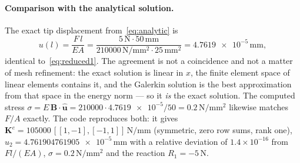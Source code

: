 \documentclass[11pt,a4paper]{article}
\numberwithin{equation}{section}
\theoremstyle{remark}
\newcommand{\bB}{\bm{B}}
\newcommand{\bK}{\bm{K}}
\newcommand{\buh}{\hat{\bm{u}}}
\begin{document}
\paragraph{Comparison with the analytical solution.}
The exact tip displacement from~\eqref{eq:analytic} is
\begin{equation}\label{eq:exacttip}
  u(l) = \frac{F\,l}{EA} = \frac{5\,\mathrm{N}\cdot 50\,\mathrm{mm}}
  {\num{210000}\,\mathrm{N/mm^2}\cdot 25\,\mathrm{mm^2}} = \num{4.7619e-5}\,\mathrm{mm},
\end{equation}
identical to~\eqref{eq:reduced1}. The agreement is not a coincidence and not a matter of
mesh refinement: the exact solution is linear in $x$, the finite element space of linear
elements contains it, and the Galerkin solution is the best approximation from that space
in the energy norm --- so it \emph{is} the exact solution. The computed stress
$\sigma = E\,\bB\cdot\buh = \num{210000}\cdot\num{4.7619e-5}/50 = 0.2\,\mathrm{N/mm^2}$
likewise matches $F/A$ exactly. The code reproduces both: it gives
$\bK^e = \num{105000}\,[[1,-1],[-1,1]]\,\mathrm{N/mm}$ (symmetric, zero row sums, rank one),
$\hat u_2 = \num{4.761904761905e-5}\,\mathrm{mm}$ with a relative deviation of $1.4\times10^{-16}$
from $Fl/(EA)$, $\sigma = 0.2\,\mathrm{N/mm^2}$ and the reaction $R_1 = -5\,\mathrm{N}$.
\end{document}
